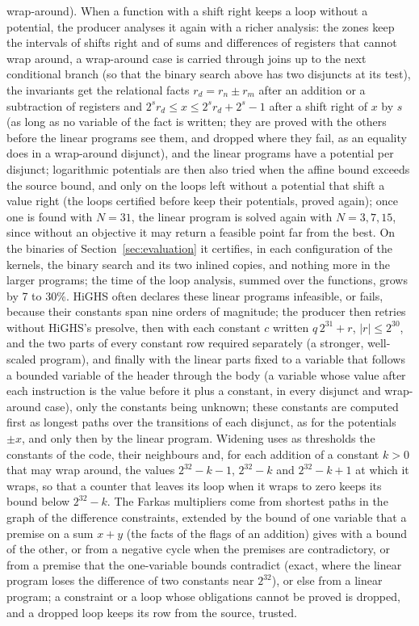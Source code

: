 \documentclass[oneside,english]{amsart}
\numberwithin{equation}{section}
\theoremstyle{plain}
\theoremstyle{definition}
\theoremstyle{plain}
\theoremstyle{plain}
\theoremstyle{remark}
\begin{document}
wrap-around). When a function with a shift right keeps a loop without a potential, the producer analyses it again with a richer analysis: the zones keep the intervals of shifts right and of sums and differences of registers that cannot wrap around, a wrap-around case is carried through joins up to the next conditional branch (so that the binary search above has two disjuncts at its test), the invariants get the relational facts $r_d = r_n \pm r_m$ after an addition or a subtraction of registers and $2^{s} r_d \le x \le 2^{s} r_d + 2^{s} - 1$ after a shift right of $x$ by $s$ (as long as no variable of the fact is written; they are proved with the others before the linear programs see them, and dropped where they fail, as an equality does in a wrap-around disjunct), and the linear programs have a potential per disjunct; logarithmic potentials are then also tried when the affine bound exceeds the source bound, and only on the loops left without a potential that shift a value right (the loops certified before keep their potentials, proved again); once one is found with $N = 31$, the linear program is solved again with $N = 3, 7, 15$, since without an objective it may return a feasible point far from the best. On the binaries of Section~\ref{sec:evaluation} it certifies, in each configuration of the kernels, the binary search and its two inlined copies, and nothing more in the larger programs; the time of the loop analysis, summed over the functions, grows by 7 to 30\%. HiGHS often declares these linear programs infeasible, or fails, because their constants span nine orders of magnitude; the producer then retries without HiGHS's presolve, then with each constant $c$ written $q\, 2^{31} + r$, $|r| \le 2^{30}$, and the two parts of every constant row required separately (a stronger, well-scaled program), and finally with the linear parts fixed to a variable that follows a bounded variable of the header through the body (a variable whose value after each instruction is the value before it plus a constant, in every disjunct and wrap-around case), only the constants being unknown; these constants are computed first as longest paths over the transitions of each disjunct, as for the potentials $\pm x$, and only then by the linear program. Widening uses as thresholds the constants of the code, their neighbours and, for each addition of a constant $k > 0$ that may wrap around, the values $2^{32} - k - 1$, $2^{32} - k$ and $2^{32} - k + 1$ at which it wraps, so that a counter that leaves its loop when it wraps to zero keeps its bound below $2^{32} - k$. The Farkas multipliers come from shortest paths in the graph of the difference constraints, extended by the bound of one variable that a premise on a sum $x + y$ (the facts of the flags of an addition) gives with a bound of the other, or from a negative cycle when the premises are contradictory, or from a premise that the one-variable bounds contradict (exact, where the linear program loses the difference of two constants near $2^{32}$), or else from a linear program; a constraint or a loop whose obligations cannot be proved is dropped, and a dropped loop keeps its row from the source, trusted.
\end{document}
